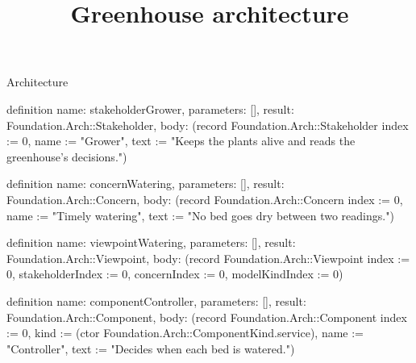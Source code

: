\begin{lexlean}{Architecture}
\title{Greenhouse architecture}
\begin{semanticmodule}
definition{
  name: stakeholderGrower,
  parameters: [],
  result: Foundation.Arch::Stakeholder,
  body: (record Foundation.Arch::Stakeholder {index := 0, name := "Grower", text := "Keeps the plants alive and reads the greenhouse's decisions."})
}

definition{
  name: concernWatering,
  parameters: [],
  result: Foundation.Arch::Concern,
  body: (record Foundation.Arch::Concern {index := 0, name := "Timely watering", text := "No bed goes dry between two readings."})
}

definition{
  name: viewpointWatering,
  parameters: [],
  result: Foundation.Arch::Viewpoint,
  body: (record Foundation.Arch::Viewpoint {index := 0, stakeholderIndex := 0, concernIndex := 0, modelKindIndex := 0})
}

definition{
  name: componentController,
  parameters: [],
  result: Foundation.Arch::Component,
  body: (record Foundation.Arch::Component {index := 0, kind := (ctor Foundation.Arch::ComponentKind.service), name := "Controller", text := "Decides when each bed is watered."})
}
\end{semanticmodule}
\end{lexlean}
